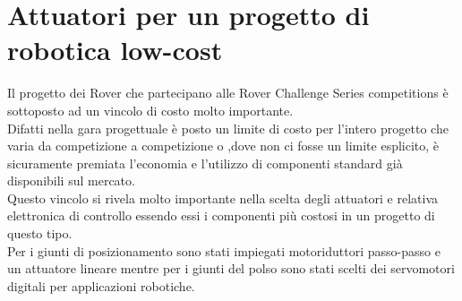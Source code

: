 \documentclass[%
corpo=11pt,
twoside,
 stile=classica,
oldstyle,
greek,%
]{toptesi}
\begin{document}
\chapter{Attuatori per un progetto di robotica low-cost} 
Il progetto dei Rover che partecipano alle Rover Challenge Series competitions è sottoposto ad un vincolo di costo molto importante.\\
 Difatti nella gara progettuale è posto un limite di costo per l'intero progetto che varia da competizione a competizione o ,dove non ci fosse un limite esplicito, è sicuramente premiata l'economia e l'utilizzo di componenti standard già disponibili sul mercato. \\
Questo vincolo si rivela molto importante nella scelta degli attuatori e relativa elettronica di controllo essendo essi i componenti più costosi in un progetto di questo tipo. \\
Per i giunti di posizionamento sono stati impiegati motoriduttori passo-passo e un attuatore lineare mentre per i giunti del polso sono stati scelti dei servomotori digitali per applicazioni robotiche. 
\end{document}
